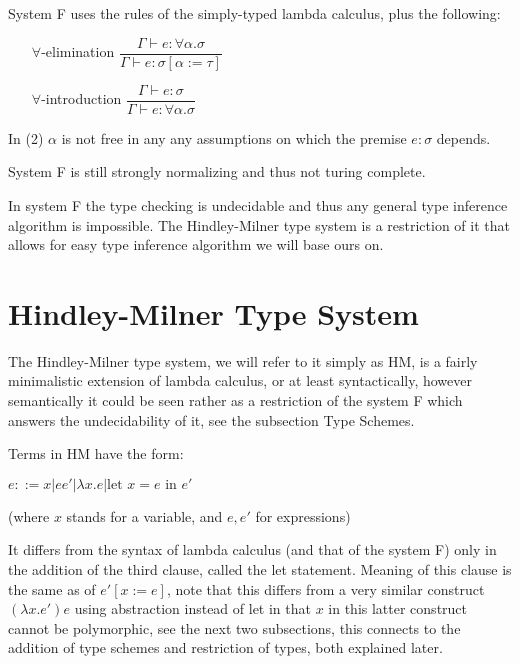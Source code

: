System F uses the rules of the simply-typed lambda calculus, plus the following:

\begin{itemize}
    \item[$\forall$-elimination] $\dfrac{\Gamma \vdash e : \forall \alpha . \sigma}{\Gamma \vdash e : \sigma [\alpha := \tau]}$
    \item[$\forall$-introduction] $\dfrac{\Gamma \vdash e : \sigma}{\Gamma \vdash e : \forall \alpha . \sigma}$
\end{itemize}

In (2) $\alpha$ is not free in any any assumptions on which the premise $e : \sigma$ depends. %

System F is still strongly normalizing and thus not turing complete. %

In system F the type checking is undecidable and thus any general type inference algorithm is impossible.
The Hindley-Milner type system is a restriction of it %
that allows for easy type inference algorithm we will base ours on.

\section{Hindley-Milner Type System}

The Hindley-Milner type system, we will refer to it simply as HM, is a fairly minimalistic extension of lambda calculus, or at least syntactically, however semantically it could be seen rather as a restriction of the system F which answers the undecidability of it, see the subsection Type Schemes. %

Terms in HM have the form:

$e ::= x | e e' | \lambda x . e | \text{let } x = e \text{ in } e'$

(where $x$ stands for a variable, and $e, e'$ for expressions)

It differs from the syntax of lambda calculus (and that of the system F) only in the addition of the third clause, called the let statement. Meaning of this clause is the same as of $e' [x := e]$, note that this differs from a very similar construct $(\lambda x . e') e$ using abstraction instead of let in that $x$ in this latter construct cannot be polymorphic, see the next two subsections, this connects to the addition of type schemes and restriction of types, both explained later. %

